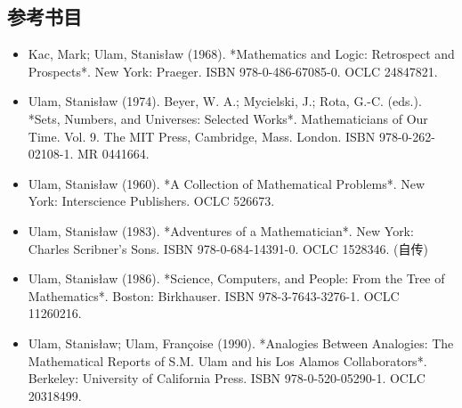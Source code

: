 \subsection{参考书目}
\begin{itemize}
\item Kac, Mark; Ulam, Stanisław (1968). *Mathematics and Logic: Retrospect and Prospects*. New York: Praeger. ISBN 978-0-486-67085-0. OCLC 24847821.
\item Ulam, Stanisław (1974). Beyer, W. A.; Mycielski, J.; Rota, G.-C. (eds.). *Sets, Numbers, and Universes: Selected Works*. Mathematicians of Our Time. Vol. 9. The MIT Press, Cambridge, Mass. London. ISBN 978-0-262-02108-1. MR 0441664.
\item Ulam, Stanisław (1960). *A Collection of Mathematical Problems*. New York: Interscience Publishers. OCLC 526673.
\item Ulam, Stanisław (1983). *Adventures of a Mathematician*. New York: Charles Scribner's Sons. ISBN 978-0-684-14391-0. OCLC 1528346. (自传)
\item Ulam, Stanisław (1986). *Science, Computers, and People: From the Tree of Mathematics*. Boston: Birkhauser. ISBN 978-3-7643-3276-1. OCLC 11260216.
\item Ulam, Stanisław; Ulam, Françoise (1990). *Analogies Between Analogies: The Mathematical Reports of S.M. Ulam and his Los Alamos Collaborators*. Berkeley: University of California Press. ISBN 978-0-520-05290-1. OCLC 20318499.
\end{itemize}